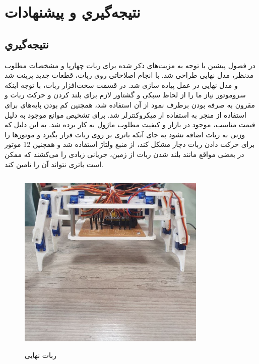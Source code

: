 \chapter{نتيجه‌گيري و پیشنهادات}

\section{نتيجه‌گيري}
در فصول پیشین با توجه به مزیت‌های ذکر شده برای ربات چهارپا و مشخصات مطلوب مدنظر، مدل نهایی طراحی شد. با انجام اصلاحاتی روی ربات، قطعات جدید پرینت شد و مدل نهایی در عمل پیاده سازی شد. در قسمت سخت‌افزار ربات، با توجه اینکه سروموتور  نیاز ما را از لحاظ سبکی و گشتاور لازم برای بلند کردن و حرکت ربات و مقرون به صرفه بودن برطرف نمود از آن استفاده شد، همچنین کم بودن پایه‌های  برای استفاده از  منجر به استفاده از میکروکنترلر  شد. برای تشخیص موانع موجود به دلیل قیمت مناسب، موجود در بازار و کیفیت مطلوب ماژول  به کار برده شد. به این دلیل که وزنی به ربات اضافه نشود به جای آنکه باتری بر روی ربات قرار بگیرد و موتورها را برای حرکت دادن ربات دچار مشکل کند، از منبع ولتاژ  استفاده شد و همچنین 12 موتور در بعضی مواقع مانند بلند شدن ربات از زمین، جریانی زیادی را می‌کشند که ممکن است باتری نتواند آن را تامین کند.
	\begin{figure}[!h]
	\centering
	\includegraphics[width=9cm,height=9cm]{./Images/CH5/IMG_1.jpg}
	\caption{ربات نهایی}
	\end{figure}
	
